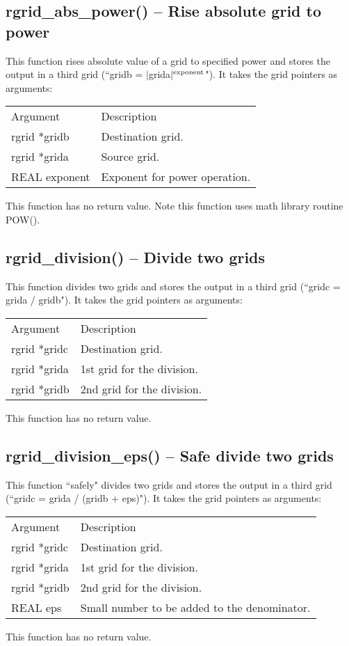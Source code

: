 \documentclass[12pt,letterpaper]{report}
\begin{document}
\subsection{rgrid\_abs\_power() -- Rise absolute grid to power}

This function rises absolute value of a grid to specified power and stores the output in a third grid (``gridb = $|$grida$|^\textnormal{exponent}$"). It takes the grid pointers as arguments:
\begin{longtable}{p{} p{}}
Argument & Description\\
\cline{1-2}
rgrid *gridb & Destination grid.\\
rgrid *grida & Source grid.\\
REAL exponent & Exponent for power operation.\\
\end{longtable}
\noindent
This function has no return value. Note this function uses math library routine POW().

\subsection{rgrid\_division() -- Divide two grids}

This function divides two grids and stores the output in a third grid (``gridc = grida / gridb"). It takes the grid pointers as arguments:
\begin{longtable}{p{} p{}}
Argument & Description\\
\cline{1-2}
rgrid *gridc & Destination grid.\\
rgrid *grida & 1st grid for the division.\\
rgrid *gridb & 2nd grid for the division.\\
\end{longtable}
\noindent
This function has no return value.

\subsection{rgrid\_division\_eps() -- Safe divide two grids}

This function ``safely" divides two grids and stores the output in a third grid (``gridc = grida / (gridb + eps)"). It takes the grid pointers as arguments:
\begin{longtable}{p{} p{}}
Argument & Description\\
\cline{1-2}
rgrid *gridc & Destination grid.\\
rgrid *grida & 1st grid for the division.\\
rgrid *gridb & 2nd grid for the division.\\
REAL eps & Small number to be added to the denominator.\\
\end{longtable}
\noindent
This function has no return value.
\end{document}
